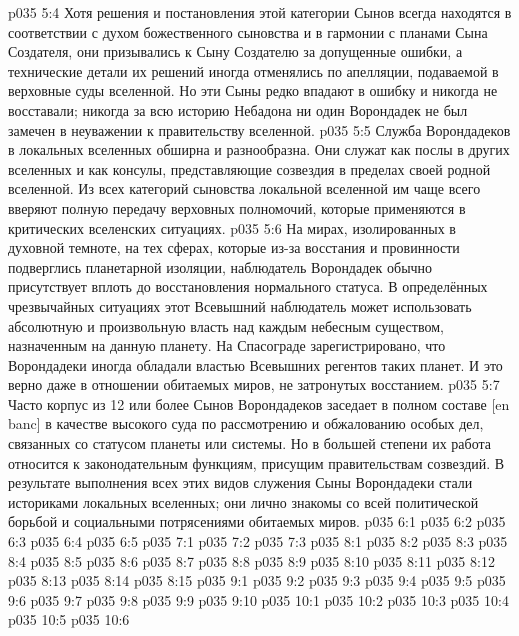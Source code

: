 \vs p035 5:4 Хотя решения и постановления этой категории Сынов всегда находятся в соответствии с духом божественного сыновства и в гармонии с планами Сына Создателя, они призывались к Сыну Создателю за допущенные ошибки, а технические детали их решений иногда отменялись по апелляции, подаваемой в верховные суды вселенной. Но эти Сыны редко впадают в ошибку и никогда не восставали; никогда за всю историю Небадона ни один Ворондадек не был замечен в неуважении к правительству вселенной.
\vs p035 5:5 Служба Ворондадеков в локальных вселенных обширна и разнообразна. Они служат как послы в других вселенных и как консулы, представляющие созвездия в пределах своей родной вселенной. Из всех категорий сыновства локальной вселенной им чаще всего вверяют полную передачу верховных полномочий, которые применяются в критических вселенских ситуациях.
\vs p035 5:6 На мирах, изолированных в духовной темноте, на тех сферах, которые из\hyp{}за восстания и провинности подверглись планетарной изоляции, наблюдатель Ворондадек обычно присутствует вплоть до восстановления нормального статуса. В определённых чрезвычайных ситуациях этот Всевышний наблюдатель может использовать абсолютную и произвольную власть над каждым небесным существом, назначенным на данную планету. На Спасограде зарегистрировано, что Ворондадеки иногда обладали властью Всевышних регентов таких планет. И это верно даже в отношении обитаемых миров, не затронутых восстанием.
\vs p035 5:7 Часто корпус из 12 или более Сынов Ворондадеков заседает в полном составе [en banc] в качестве высокого суда по рассмотрению и обжалованию особых дел, связанных со статусом планеты или системы. Но в большей степени их работа относится к законодательным функциям, присущим правительствам созвездий. В результате выполнения всех этих видов служения Сыны Ворондадеки стали историками локальных вселенных; они лично знакомы со всей политической борьбой и социальными потрясениями обитаемых миров.
\vs p035 6:1 
\vs p035 6:2 
\vs p035 6:3 
\vs p035 6:4 
\vs p035 6:5 
\vs p035 7:1 
\vs p035 7:2 
\vs p035 7:3 
\vs p035 8:1 
\vs p035 8:2 
\vs p035 8:3 
\vs p035 8:4 
\vs p035 8:5 
\vs p035 8:6 
\vs p035 8:7 \pc 
\vs p035 8:8 
\vs p035 8:9 \pc 
\vs p035 8:10 
\vs p035 8:11 
\vs p035 8:12 
\vs p035 8:13 
\vs p035 8:14 
\vs p035 8:15 \pc 
{}
\vs p035 9:1 
\vs p035 9:2 
\vs p035 9:3 
\vs p035 9:4 
\vs p035 9:5 \pc 
\vs p035 9:6 
\vs p035 9:7 
\vs p035 9:8 
\vs p035 9:9 \pc 
\vs p035 9:10 
\vs p035 10:1 
\vs p035 10:2 
\vs p035 10:3 
\vs p035 10:4 \pc 
\vs p035 10:5 \pc 
\vsetoff
\vs p035 10:6 
\quizlink
